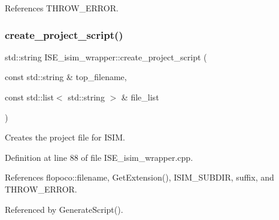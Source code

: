 References T\+H\+R\+O\+W\+\_\+\+E\+R\+R\+OR.

\mbox{\label{classISE__isim__wrapper_a3c70d0ac9c358331df4e9519db77c2f8}} 
\subsubsection{\texorpdfstring{create\+\_\+project\+\_\+script()}{create\_project\_script()}}
{\footnotesize\ttfamily std\+::string I\+S\+E\+\_\+isim\+\_\+wrapper\+::create\+\_\+project\+\_\+script (\begin{DoxyParamCaption}\item[{const std\+::string \&}]{top\+\_\+filename,  }\item[{const std\+::list$<$ std\+::string $>$ \&}]{file\+\_\+list }\end{DoxyParamCaption})\hspace{0.3cm}{\ttfamily [private]}}



Creates the project file for I\+S\+IM. 



Definition at line 88 of file I\+S\+E\+\_\+isim\+\_\+wrapper.\+cpp.



References flopoco\+::filename, Get\+Extension(), I\+S\+I\+M\+\_\+\+S\+U\+B\+D\+IR, suffix, and T\+H\+R\+O\+W\+\_\+\+E\+R\+R\+OR.



Referenced by Generate\+Script().

